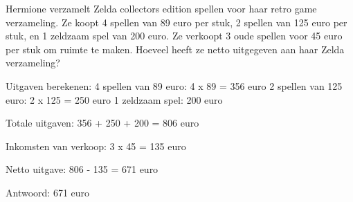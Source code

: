 \begin{opgave}
Hermione verzamelt Zelda collectors edition spellen voor haar retro game 
verzameling. Ze koopt 4 spellen van 89 euro per stuk, 2 spellen van 125 euro 
per stuk, en 1 zeldzaam spel van 200 euro. Ze verkoopt 3 oude spellen voor 45 
euro per stuk om ruimte te maken. Hoeveel heeft ze netto uitgegeven aan haar 
Zelda verzameling?
\end{opgave}

\begin{oplossing}
Uitgaven berekenen:
4 spellen van 89 euro: 4 x 89 = 356 euro
2 spellen van 125 euro: 2 x 125 = 250 euro
1 zeldzaam spel: 200 euro

Totale uitgaven:
356 + 250 + 200 = 806 euro

Inkomsten van verkoop:
3 x 45 = 135 euro

Netto uitgave:
806 - 135 = 671 euro

Antwoord: 671 euro
\end{oplossing}